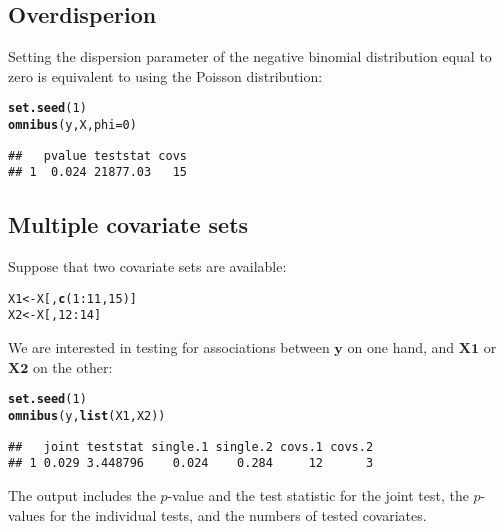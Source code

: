 \documentclass{article}\usepackage[]{graphicx}\usepackage[]{color}
\makeatletter
\newcommand{\hlnum}[1]{\textcolor[rgb]{0.686,0.059,0.569}{#1}}%
\newcommand{\hlopt}[1]{\textcolor[rgb]{0,0,0}{#1}}%
\newcommand{\hlstd}[1]{\textcolor[rgb]{0.345,0.345,0.345}{#1}}%
\newcommand{\hlkwb}[1]{\textcolor[rgb]{0.69,0.353,0.396}{#1}}%
\newcommand{\hlkwc}[1]{\textcolor[rgb]{0.333,0.667,0.333}{#1}}%
\newcommand{\hlkwd}[1]{\textcolor[rgb]{0.737,0.353,0.396}{\textbf{#1}}}%
\newenvironment{kframe}{%
 \def\at@end@of@kframe{}%
 \ifinner\ifhmode%
  \def\at@end@of@kframe{\end{minipage}}%
  \begin{minipage}{\columnwidth}%
 \fi\fi%
 \def\FrameCommand##1{\hskip\@totalleftmargin \hskip-\fboxsep
 \colorbox{shadecolor}{##1}\hskip-\fboxsep
     \hskip-\linewidth \hskip-\@totalleftmargin \hskip\columnwidth}%
 \MakeFramed {\advance\hsize-\width
   \@totalleftmargin\z@ \linewidth\hsize
   \@setminipage}}%
 {\par\unskip\endMakeFramed%
 \at@end@of@kframe}
\newenvironment{knitrout}{}{} %
\makeatother
\begin{document}
\newpage

\subsection{Overdisperion}
\label{omnibus_overdispersion}

Setting the dispersion parameter of the negative binomial distribution equal to zero is equivalent to using the Poisson distribution:
\begin{knitrout}
\color{fgcolor}\begin{kframe}
\begin{alltt}
\hlkwd{set.seed}\hlstd{(}\hlnum{1}\hlstd{)}
\hlkwd{omnibus}\hlstd{(y,X,}\hlkwc{phi}\hlstd{=}\hlnum{0}\hlstd{)}
\end{alltt}
\begin{verbatim}
##   pvalue teststat covs
## 1  0.024 21877.03   15
\end{verbatim}
\end{kframe}
\end{knitrout}

\subsection{Multiple covariate sets}
\label{omnibus_multiple_covariate_sets}

Suppose that two covariate sets are available:
\begin{knitrout}
\color{fgcolor}\begin{kframe}
\begin{alltt}
\hlstd{X1} \hlkwb{<-} \hlstd{X[,}\hlkwd{c}\hlstd{(}\hlnum{1}\hlopt{:}\hlnum{11}\hlstd{,}\hlnum{15}\hlstd{)]}
\hlstd{X2} \hlkwb{<-} \hlstd{X[,}\hlnum{12}\hlopt{:}\hlnum{14}\hlstd{]}
\end{alltt}
\end{kframe}
\end{knitrout}

We are interested in testing for associations between $\boldsymbol{y}$ on one hand, and $\boldsymbol{X1}$ or $\boldsymbol{X2}$ on the other:
\begin{knitrout}
\color{fgcolor}\begin{kframe}
\begin{alltt}
\hlkwd{set.seed}\hlstd{(}\hlnum{1}\hlstd{)}
\hlkwd{omnibus}\hlstd{(y,}\hlkwd{list}\hlstd{(X1,X2))}
\end{alltt}
\begin{verbatim}
##   joint teststat single.1 single.2 covs.1 covs.2
## 1 0.029 3.448796    0.024    0.284     12      3
\end{verbatim}
\end{kframe}
\end{knitrout}
The output includes the \mbox{$p$-value} and the test statistic for the joint test, the \mbox{$p$-values} for the individual tests, and the numbers of tested covariates.
\end{document}
